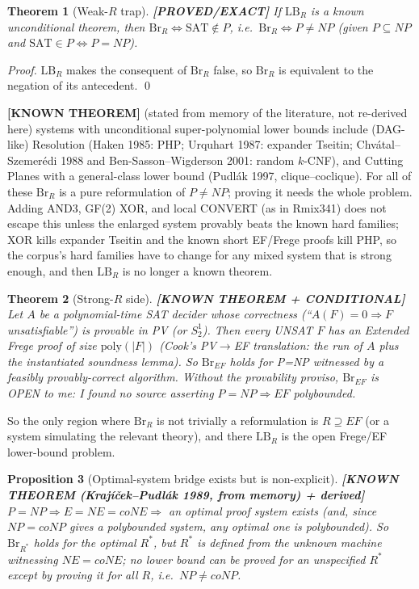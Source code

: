 \documentclass[11pt]{article}
\newtheorem{theorem}{Theorem}
\newtheorem{proposition}[theorem]{Proposition}
\newcommand{\status}[1]{\textbf{[#1]}}
\newcommand{\SAT}{\mathrm{SAT}}
\begin{document}
\begin{theorem}[Weak-$R$ trap]\status{PROVED/EXACT}
If $\mathrm{LB}_R$ is a known unconditional theorem, then $\mathrm{Br}_R\iff \SAT\notin P$, i.e.\ $\mathrm{Br}_R\iff P\ne NP$ (given $P\subseteq NP$ and $\SAT\in P\iff P=NP$).
\end{theorem}
\begin{proof}
$\mathrm{LB}_R$ makes the consequent of $\mathrm{Br}_R$ false, so $\mathrm{Br}_R$ is equivalent to the negation of its antecedent. \qed
\end{proof}
\noindent\status{KNOWN THEOREM} (stated from memory of the literature, not re-derived here) systems with unconditional super-polynomial lower bounds include (DAG-like) Resolution (Haken 1985: PHP; Urquhart 1987: expander Tseitin; Chv\'atal--Szemer\'edi 1988 and Ben-Sasson--Wigderson 2001: random $k$-CNF), and Cutting Planes with a general-class lower bound (Pudl\'ak 1997, clique--coclique). For all of these $\mathrm{Br}_R$ is a pure reformulation of $P\neq NP$; proving it needs the whole problem. Adding AND3, GF(2) XOR, and local CONVERT (as in Rmix341) does not escape this unless the enlarged system provably beats the known hard families; XOR kills expander Tseitin and the known short EF/Frege proofs kill PHP, so the corpus's hard families have to change for any mixed system that is strong enough, and then $\mathrm{LB}_R$ is no longer a known theorem.

\begin{theorem}[Strong-$R$ side]\status{KNOWN THEOREM + CONDITIONAL}
Let $A$ be a polynomial-time SAT decider whose correctness (``$A(F)=0\Rightarrow F$ unsatisfiable'') is provable in PV (or $S^1_2$). Then every UNSAT $F$ has an Extended Frege proof of size $\mathrm{poly}(|F|)$ (Cook's PV$\to$EF translation: the run of $A$ plus the instantiated soundness lemma). So $\mathrm{Br}_{EF}$ holds \emph{for P=NP witnessed by a feasibly provably-correct algorithm}. Without the provability proviso, $\mathrm{Br}_{EF}$ is OPEN to me: I found no source asserting $P=NP\Rightarrow EF$ polybounded.
\end{theorem}
\noindent So the only region where $\mathrm{Br}_R$ is not trivially a reformulation is $R\supseteq EF$ (or a system simulating the relevant theory), and there $\mathrm{LB}_R$ is the open Frege/EF lower-bound problem.

\begin{proposition}[Optimal-system bridge exists but is non-explicit]\status{KNOWN THEOREM (Kraj\'i\v{c}ek--Pudl\'ak 1989, from memory) + derived}
$P=NP\Rightarrow E=NE=coNE\Rightarrow$ an optimal proof system exists (and, since $NP=coNP$ gives a polybounded system, any optimal one is polybounded). So $\mathrm{Br}_{R^*}$ holds for the optimal $R^*$, but $R^*$ is defined from the unknown machine witnessing $NE=coNE$; no lower bound can be proved for an unspecified $R^*$ except by proving it for all $R$, i.e.\ $NP\ne coNP$.
\end{proposition}
\end{document}
